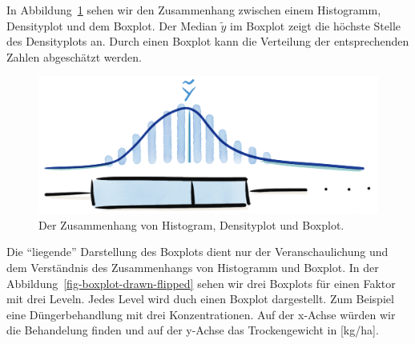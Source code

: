 \documentclass[
  letterpaper,
  DIV=11,
  oneside]{scrreport}
\begin{document}
In Abbildung~\ref{fig-boxplot-drawn-distribution} sehen wir den
Zusammenhang zwischen einem Histogramm, Densityplot und dem Boxplot. Der
Median \(\tilde{y}\) im Boxplot zeigt die höchste Stelle des
Densityplots an. Durch einen Boxplot kann die Verteilung der
entsprechenden Zahlen abgeschätzt werden.

\begin{figure}

{\centering \includegraphics[width=1\textwidth,height=\textheight]{./images/boxplot-drawn-distribution.png}

}

\caption{\label{fig-boxplot-drawn-distribution}Der Zusammenhang von
Histogram, Densityplot und Boxplot.}

\end{figure}

Die ``liegende'' Darstellung des Boxplots dient nur der
Veranschaulichung und dem Verständnis des Zusammenhangs von Histogramm
und Boxplot. In der Abbildung~\ref{fig-boxplot-drawn-flipped} sehen wir
drei Boxplots für einen Faktor mit drei Leveln. Jedes Level wird duch
einen Boxplot dargestellt. Zum Beispiel eine Düngerbehandlung mit drei
Konzentrationen. Auf der x-Achse würden wir die Behandelung finden und
auf der y-Achse das Trockengewicht in {[}kg/ha{]}.
\end{document}
